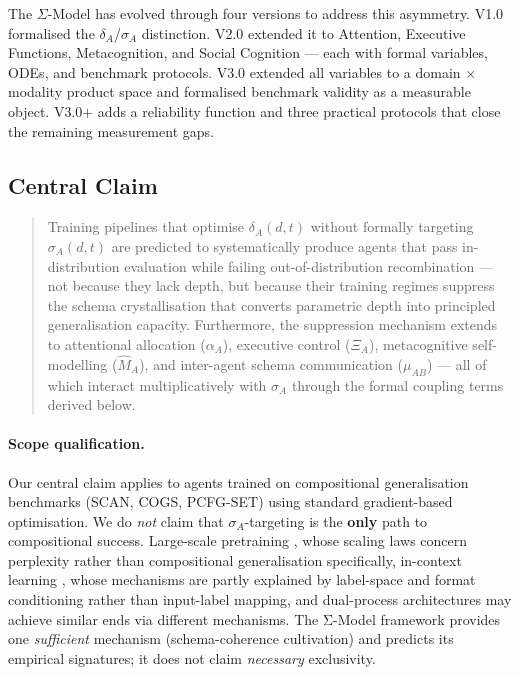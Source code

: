 The $\Sigma$-Model has evolved through four versions to address this
asymmetry. V1.0 formalised the $\delta_A$/$\sigma_A$ distinction. V2.0
extended it to Attention, Executive Functions, Metacognition, and Social
Cognition --- each with formal variables, ODEs, and benchmark protocols.
V3.0 extended all variables to a domain $\times$ modality product space
and formalised benchmark validity as a measurable object. V3.0$+$ adds a
reliability function and three practical protocols that close the remaining
measurement gaps.

\subsection{Central Claim}\label{sec:central-claim}

\begin{quote}
Training pipelines that optimise $\delta_A(d,t)$ without formally
targeting $\sigma_A(d,t)$ are predicted to systematically produce
agents that pass in-distribution evaluation while failing
out-of-distribution recombination --- not because they lack depth,
but because their training regimes suppress the schema crystallisation
that converts parametric depth into principled generalisation capacity.
Furthermore, the suppression mechanism extends to attentional allocation
($\alpha_A$), executive control ($\Xi_A$), metacognitive self-modelling
($\hat{M}_A$), and inter-agent schema communication ($\mu_{AB}$) ---
all of which interact multiplicatively with $\sigma_A$ through the
formal coupling terms derived below.
\end{quote}

\paragraph{Scope qualification.}
Our central claim applies to agents trained on compositional
generalisation benchmarks (SCAN, COGS, PCFG-SET) using standard
gradient-based optimisation. We do \emph{not} claim that
$\sigma_A$-targeting is the \textbf{only} path to compositional
success. Large-scale pretraining \citep{kaplan2020scaling}, whose scaling laws concern perplexity rather than compositional generalisation specifically,
in-context learning \citep{min2022rethinking}, whose mechanisms are partly explained by label-space and format conditioning rather than input-label mapping, and dual-process
architectures \citep{noviello2025neuroscienceinspiredualprocess} may achieve similar ends via
different mechanisms. The Σ-Model framework provides one
\emph{sufficient} mechanism (schema-coherence cultivation) and
predicts its empirical signatures; it does not claim \emph{necessary}
exclusivity.

